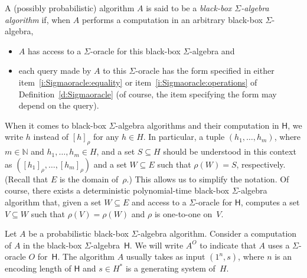 \documentclass{jgcc}
\newcommand{\bb}{\mathsf}
\newcommand{\rep}[2]{[#1]_{#2}}
\newcommand{\N}{\mathbb N}
\begin{document}
\begin{defi}
A (possibly probabilistic) algorithm $A$ is said to be a
\emph{black-box $\Sigma$-algebra algorithm} if, when $A$
performs a computation in an arbitrary black-box
$\Sigma$-algebra,
\begin{itemize}
\item $A$ has access to a $\Sigma$-oracle for this black-box
$\Sigma$-algebra and

\item each query made by $A$ to this $\Sigma$-oracle has the
form specified in either item~\ref{i:Sigmaoracle:equality}
or item~\ref{i:Sigmaoracle:operations} of
Definition~\ref{d:Sigmaoracle} (of course, the item
specifying the form may depend on the query).
\end{itemize}
\end{defi}

When it comes to black-box $\Sigma$-algebra algorithms and
their computation in $\bb H$, we write $h$ instead of $\rep
h\rho$ for any $h\in H$. In particular, a tuple
$(h_1,\dots,h_m)$, where $m\in\N$ and $h_1,\dots,h_m\in H$,
and a set $S\subseteq H$ should be understood in this
context as $(\rep{h_1}\rho,\dots,\rep{h_m}\rho)$ and a set
$W\subseteq E$ such that $\rho(W)=S$, respectively. (Recall
that $E$ is the domain of~$\rho$.) This allows us to
simplify the notation. Of course, there exists a
deterministic polynomial-time black-box $\Sigma$-algebra
algorithm that, given a set $W\subseteq E$ and access to a
$\Sigma$-oracle for $\bb H$, computes a set $V\subseteq W$
such that $\rho(V)=\rho(W)$ and $\rho$ is one-to-one on~$V$.

Let $A$ be a probabilistic black-box $\Sigma$-algebra
algorithm. Consider a computation of $A$ in the black-box
$\Sigma$-algebra~$\bb H$. We will write $A^O$ to indicate
that $A$ uses a $\Sigma$-oracle $O$ for~$\bb H$. The
algorithm $A$ usually takes as input $(1^n,s)$, where $n$ is
an encoding length of $\bb H$ and $s\in H^*$ is a generating
system of~$H$.
\end{document}
